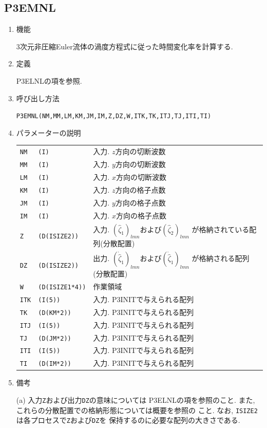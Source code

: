 \documentclass[a4j,fleqn]{jarticle}
\begin{document}

\subsection{P3EMNL}

\begin{enumerate}

\item 機能 

3次元非圧縮Euler流体の渦度方程式に従った時間変化率を計算する.

\item 定義

P3ELNLの項を参照.

\item 呼び出し方法 

{\tt P3EMNL(NM,MM,LM,KM,JM,IM,Z,DZ,W,ITK,TK,ITJ,TJ,ITI,TI)}
  
\item パラメーターの説明

\begin{tabular}{lll}
{\tt NM} & {\tt (I)} & 入力. $z$方向の切断波数\\
{\tt MM} & {\tt (I)} & 入力. $y$方向の切断波数\\
{\tt LM} & {\tt (I)} & 入力. $x$方向の切断波数\\
{\tt KM} & {\tt (I)} & 入力. $z$方向の格子点数\\
{\tt JM} & {\tt (I)} & 入力. $y$方向の格子点数\\
{\tt IM} & {\tt (I)} & 入力. $x$方向の格子点数\\
{\tt Z} & {\tt (D(ISIZE2))} & 
 入力. $(\hat{\zeta}_1)_{lmn}$および$(\hat{\zeta}_2)_{lmn}$
  が格納されている配列(分散配置)\\
{\tt DZ} & {\tt (D(ISIZE2))} & 
 出力. $(\dot{\hat{\zeta}}_1)_{lmn}$および$(\dot{\hat{\zeta}}_1)_{lmn}$
 が格納される配列(分散配置)\\
{\tt W} & {\tt (D(ISIZE1*4))} & 作業領域\\
{\tt ITK} & {\tt (I(5))} & 入力. P3INITで与えられる配列\\
{\tt TK} & {\tt (D(KM*2))} & 入力. P3INITで与えられる配列\\
{\tt ITJ} & {\tt (I(5))} & 入力. P3INITで与えられる配列\\
{\tt TJ} & {\tt (D(JM*2))} & 入力. P3INITで与えられる配列\\
{\tt ITI} & {\tt (I(5))} & 入力. P3INITで与えられる配列\\
{\tt TI} & {\tt (D(IM*2))} & 入力. P3INITで与えられる配列
\end{tabular}

\item 備考

(a) 入力{\tt Z}および出力{\tt DZ}の意味については
    P3ELNLの項を参照のこと.
    また, これらの分散配置での格納形態については概要を参照の
    こと.
    なお, {\tt ISIZE2}は各プロセスで{\tt Z}および{\tt DZ}を
    保持するのに必要な配列の大きさである.

\end{enumerate}
\end{document}
